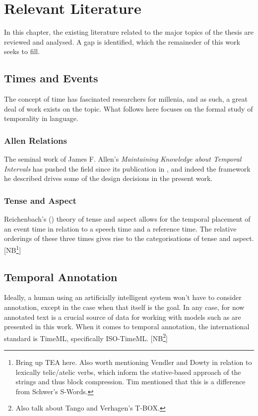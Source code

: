 \documentclass[a4paper,12pt,leqno]{article}
\newcommand{\selfnote}[1]{{\color{red}[NB\footnote{{\color{red}#1}}]}}
\begin{document}
\section{Relevant Literature}\label{sec:litreview}
In this chapter, the existing literature related to the major topics of the thesis are reviewed and analysed. A gap is identified, which the remaineder of this work seeks to fill.
\subsection{Times and Events}\label{sub:timesevents}
The concept of time has fascinated researchers for millenia, and as such, a great deal of work exists on the topic. What follows here focuses on the formal study of temporality in language.
\subsubsection{Allen Relations}\label{ssub:allen}
The seminal work of James F. Allen's \textit{Maintaining Knowledge about Temporal Intervals} has pushed the field since its publication in  \citeyear{allen1983maintaining}, and indeed the framework he described drives some of the design decisions in the present work.
\subsubsection{Tense and Aspect}\label{ssub:tenseaspect}
Reichenbach's (\citeyear{reichenbach1947elements}) theory of tense and aspect allows for the temporal placement of an event time in relation to a speech time and a reference time. The relative orderings of these three times gives rise to the categorisations of tense and aspect. \selfnote{Bring up TEA here. Also worth mentioning Vendler and Dowty in relation to lexically telic/atelic verbs, which inform the stative-based approach of the strings and thus block compression. Tim mentioned that this is a difference from Schwer's S-Words.}
\subsection{Temporal Annotation}\label{sub:annotation}
Ideally, a human using an artificially intelligent system won't have to consider annotation, except in the case when that itself is the goal. In any case, for now annotated text is a crucial source of data for working with models such as are presented in this work. When it comes to temporal annotation, the international standard is TimeML, specifically ISO-TimeML. \selfnote{Also talk about Tango and Verhagen's T-BOX.}
\end{document}
